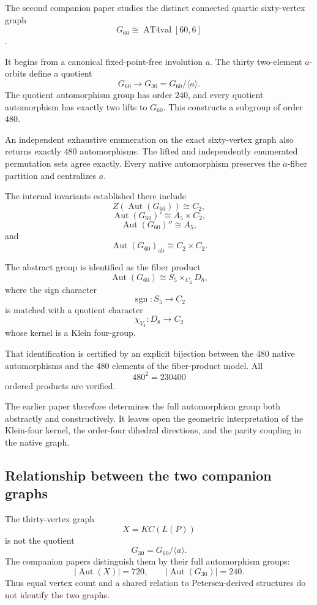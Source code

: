 The second companion paper studies the distinct connected quartic
sixty-vertex graph
\[
G_{60}\cong \operatorname{AT4val}[60,6]
\]
\cite{CaveAT4Automorphism2026}.

It begins from a canonical fixed-point-free involution \(a\). The
thirty two-element \(a\)-orbits define a quotient
\[
G_{60}\longrightarrow G_{30}=G_{60}/\langle a\rangle.
\]
The quotient automorphism group has order \(240\), and every quotient
automorphism has exactly two lifts to \(G_{60}\). This constructs a
subgroup of order \(480\).

An independent exhaustive enumeration on the exact sixty-vertex graph
also returns exactly \(480\) automorphisms. The lifted and independently
enumerated permutation sets agree exactly. Every native automorphism
preserves the \(a\)-fiber partition and centralizes \(a\).

The internal invariants established there include
\[
Z(\operatorname{Aut}(G_{60}))\cong C_2,
\]
\[
\operatorname{Aut}(G_{60})'
\cong A_5\times C_2,
\]
\[
\operatorname{Aut}(G_{60})''
\cong A_5,
\]
and
\[
\operatorname{Aut}(G_{60})_{\mathrm{ab}}
\cong C_2\times C_2.
\]

The abstract group is identified as the fiber product
\[
\operatorname{Aut}(G_{60})
\cong
S_5\times_{C_2}D_8,
\]
where the sign character
\[
\operatorname{sgn}:S_5\longrightarrow C_2
\]
is matched with a quotient character
\[
\chi_{V_4}:D_8\longrightarrow C_2
\]
whose kernel is a Klein four-group.

That identification is certified by an explicit bijection between the
\(480\) native automorphisms and the \(480\) elements of the
fiber-product model. All
\[
480^2=230400
\]
ordered products are verified.

The earlier paper therefore determines the full automorphism group
both abstractly and constructively. It leaves open the geometric
interpretation of the Klein-four kernel, the order-four dihedral
directions, and the parity coupling in the native graph.

\subsection{Relationship between the two companion graphs}

The thirty-vertex graph
\[
X=KC(L(P))
\]
is not the quotient
\[
G_{30}=G_{60}/\langle a\rangle.
\]
The companion papers distinguish them by their full automorphism
groups:
\[
|\operatorname{Aut}(X)|=720,
\qquad
|\operatorname{Aut}(G_{30})|=240.
\]
Thus equal vertex count and a shared relation to Petersen-derived
structures do not identify the two graphs.

